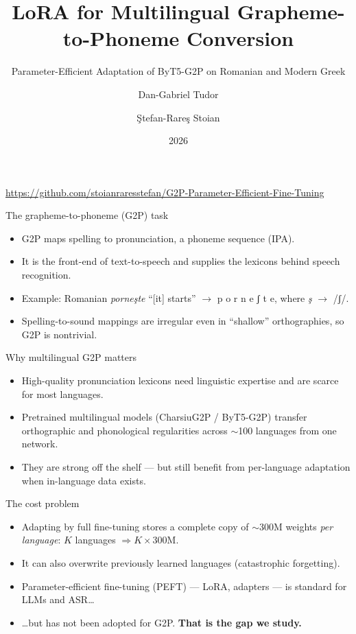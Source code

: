 \documentclass[aspectratio=169]{beamer}
\title[LoRA for Multilingual G2P]{LoRA for Multilingual Grapheme-to-Phoneme Conversion}
\subtitle{Parameter-Efficient Adaptation of ByT5-G2P on Romanian and Modern Greek}
\author[Tudor, Stoian]{Dan-Gabriel Tudor \and \c{S}tefan-Rare\c{s} Stoian}
\institute[UB]{Faculty of Mathematics and Informatics \\ University of Bucharest}
\date{2026}
\newcommand{\ipa}[1]{{\ipafont #1}}
\begin{document}
\begin{frame}[plain]
  \titlepage
  \begin{center}\scriptsize
  \url{https://github.com/stoianraresstefan/G2P-Parameter-Efficient-Fine-Tuning}
  \end{center}
\end{frame}

\begin{frame}{The grapheme-to-phoneme (G2P) task}
  \begin{itemize}
    \item G2P maps spelling to pronunciation, a phoneme sequence (IPA).
    \item It is the front-end of \alert{text-to-speech} and supplies the lexicons behind \alert{speech recognition}.
    \item Example: Romanian \emph{porne\c{s}te} ``[it] starts'' $\rightarrow$ \ipa{p o r n e ʃ t e}, where \emph{\c{s}} $\rightarrow$ \ipa{/ʃ/}.
    \item Spelling-to-sound mappings are irregular even in ``shallow'' orthographies, so G2P is nontrivial.
  \end{itemize}
\end{frame}

\begin{frame}{Why multilingual G2P matters}
  \begin{itemize}
    \item High-quality pronunciation lexicons need linguistic expertise and are \alert{scarce} for most languages.
    \item Pretrained multilingual models (CharsiuG2P / ByT5-G2P) transfer orthographic and phonological regularities across $\sim$100 languages from \alert{one} network.
    \item They are strong off the shelf --- but still benefit from \alert{per-language adaptation} when in-language data exists.
  \end{itemize}
\end{frame}

\begin{frame}{The cost problem}
  \begin{itemize}
    \item Adapting by \alert{full fine-tuning} stores a complete copy of $\sim$300M weights \emph{per language}: $K$ languages $\Rightarrow K\times 300$M.
    \item It can also \alert{overwrite} previously learned languages (catastrophic forgetting).
    \item Parameter-efficient fine-tuning (PEFT) --- LoRA, adapters --- is standard for LLMs and ASR\ldots
    \item \ldots but has \alert{not} been adopted for G2P. \textbf{That is the gap we study.}
  \end{itemize}
\end{frame}
\end{document}
